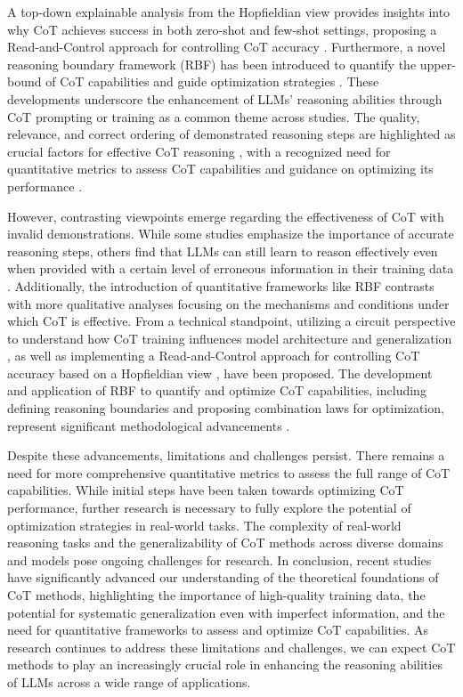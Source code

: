 \documentclass[conference]{IEEEtran}
\begin{document}
A top-down explainable analysis from the Hopfieldian view provides insights into why CoT achieves success in both zero-shot and few-shot settings, proposing a Read-and-Control approach for controlling CoT accuracy \cite{b2}. Furthermore, a novel reasoning boundary framework (RBF) has been introduced to quantify the upper-bound of CoT capabilities and guide optimization strategies \cite{b3}. These developments underscore the enhancement of LLMs' reasoning abilities through CoT prompting or training as a common theme across studies. The quality, relevance, and correct ordering of demonstrated reasoning steps are highlighted as crucial factors for effective CoT reasoning \cite{b4}, with a recognized need for quantitative metrics to assess CoT capabilities and guidance on optimizing its performance \cite{b3}.

However, contrasting viewpoints emerge regarding the effectiveness of CoT with invalid demonstrations. While some studies emphasize the importance of accurate reasoning steps, others find that LLMs can still learn to reason effectively even when provided with a certain level of erroneous information in their training data \cite{b4}. Additionally, the introduction of quantitative frameworks like RBF contrasts with more qualitative analyses focusing on the mechanisms and conditions under which CoT is effective. From a technical standpoint, utilizing a circuit perspective to understand how CoT training influences model architecture and generalization \cite{b1}, as well as implementing a Read-and-Control approach for controlling CoT accuracy based on a Hopfieldian view \cite{b2}, have been proposed. The development and application of RBF to quantify and optimize CoT capabilities, including defining reasoning boundaries and proposing combination laws for optimization, represent significant methodological advancements \cite{b3}.

Despite these advancements, limitations and challenges persist. There remains a need for more comprehensive quantitative metrics to assess the full range of CoT capabilities. While initial steps have been taken towards optimizing CoT performance, further research is necessary to fully explore the potential of optimization strategies in real-world tasks. The complexity of real-world reasoning tasks and the generalizability of CoT methods across diverse domains and models pose ongoing challenges for research. In conclusion, recent studies have significantly advanced our understanding of the theoretical foundations of CoT methods, highlighting the importance of high-quality training data, the potential for systematic generalization even with imperfect information, and the need for quantitative frameworks to assess and optimize CoT capabilities. As research continues to address these limitations and challenges, we can expect CoT methods to play an increasingly crucial role in enhancing the reasoning abilities of LLMs across a wide range of applications.
\end{document}
